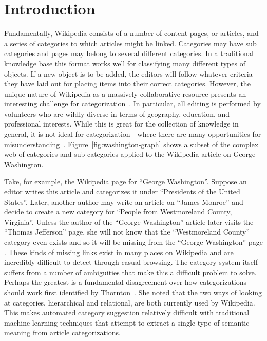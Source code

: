 \documentclass{sig-alternate}
\begin{document}
\section{Introduction}
\label{sec:intro}
Fundamentally, Wikipedia consists of a number of content pages, or articles, and a series of categories to which articles might be linked. Categories may have sub categories and pages may belong to several different categories. In a traditional knowledge base this format works well for classifying many different types of objects. If a new object is to be added, the editors will follow whatever criteria they have laid out for placing items into their correct categories. However, the unique nature of Wikipedia as a massively collaborative resource presents an interesting challenge for categorization~\cite{Richardson}. In particular, all editing is performed by volunteers who are wildly diverse in terms of geography, education, and professional interests. While this is great for the collection of knowledge in general, it is not ideal for categorization---where there are many opportunities for misunderstanding~\cite{McDonald}. Figure~\ref{fig:washington-graph} shows a subset of the complex web of categories and sub-categories applied to the Wikipedia article on George Washington.

Take, for example, the Wikipedia page for ``George Washington''. Suppose an editor writes this article and categorizes it under ``Presidents of the United States''. Later, another author may write an article on ``James Monroe'' and decide to create a new category for ``People from Westmoreland County, Virginia''. Unless the author of the ``George Washington'' article later visits the ``Thomas Jefferson'' page, she will not know that the ``Westmoreland County'' category even exists and so it will be missing from the ``George Washington'' page . These kinds of missing links exist in many places on Wikipedia and are incredibly difficult to detect through casual browsing. The category system itself suffers from a number of ambiguities that make this a difficult problem to solve. Perhaps the greatest is a fundamental disagreement over how categorizations should work first identified by Thornton~\cite{Thornton}. She noted that the two ways of looking at categories, hierarchical and relational, are both currently used by Wikipedia. This makes automated category suggestion relatively difficult with traditional machine learning techniques that attempt to extract a single type of semantic meaning from article categorizations.
\end{document}
